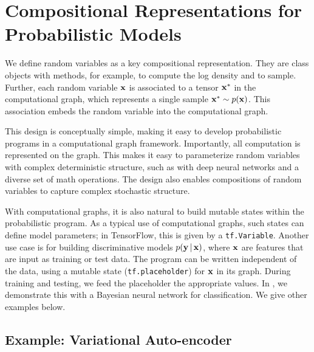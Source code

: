 \section{Compositional Representations for Probabilistic Models}
\label{sec:modeling_language}

We define random variables as a key compositional representation.
They are class objects with methods, for example, to compute the log density
and to sample. Further, each random variable $\boldsymbol{\mathbf{x}}$ is associated to a
tensor $\boldsymbol{\mathbf{x}}^*$ in the computational graph, which represents a single
sample $\boldsymbol{\mathbf{x}}^*\sim p(\boldsymbol{\mathbf{x}})$.  This association embeds the random
variable into the computational graph.

This design is conceptually simple, making it easy to develop
probabilistic programs in a computational graph framework.
Importantly, all computation is represented on the graph.  This makes
it easy to parameterize random variables with complex deterministic
structure, such as with deep neural networks and a diverse set of math
operations.  The design also enables compositions of random variables
to capture complex stochastic structure.

With computational graphs, it is also natural to build mutable states
within the probabilistic program.  As a typical use of computational
graphs, such states can define model parameters; in TensorFlow, this
is given by a \texttt{tf.Variable}.  Another use case is for building
discriminative models $p(\boldsymbol{\mathbf{y}}\,|\,\boldsymbol{\mathbf{x}})$, where
$\boldsymbol{\mathbf{x}}$ are features that are input as training or test data.  The
program can be written independent of the data, using a mutable state
(\texttt{tf.placeholder}) for $\boldsymbol{\mathbf{x}}$ in its graph.
During training and testing, we feed the placeholder the appropriate
values.
In , we demonstrate this with a Bayesian neural
network for classification.
We give other examples below.


\subsection{Example: Variational Auto-encoder}

